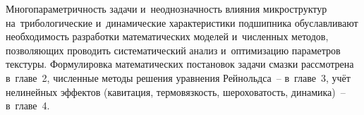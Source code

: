 Многопараметричность задачи и~неоднозначность влияния
микроструктур на~трибологические и~динамические характеристики
подшипника обуславливают необходимость разработки
математических моделей и~численных методов, позволяющих
проводить систематический анализ и~оптимизацию параметров
текстуры. Формулировка математических постановок задачи смазки
рассмотрена в~главе~2, численные методы решения уравнения
Рейнольдса~-- в~главе~3, учёт нелинейных эффектов (кавитация,
термовязкость, шероховатость, динамика)~-- в~главе~4.